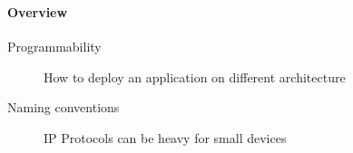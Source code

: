 \documentclass[utf8,xcolor=table, page number]{earlywinter}
\begin{document}
\begin{frame}
  \frametitle{\subsecname}
  \framesubtitle{Overview}
  \begin{description}
    \item[{\color{orange!95!black}Programmability}] How to deploy an application on different architecture
    \item[{\color{orange!95!black}Naming conventions}] IP Protocols can be heavy for small devices
  \end{description}
\end{frame}

% 
% 
%   
% 
\end{document}
